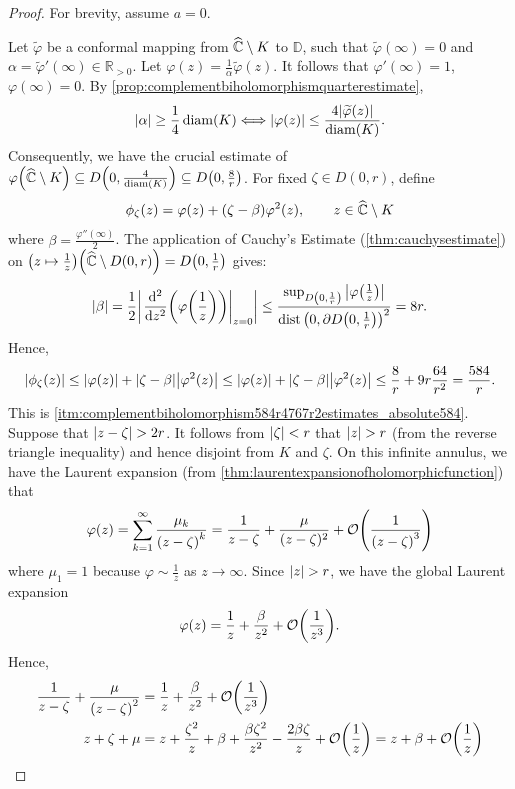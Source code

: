 \begin{proof}
    For brevity, assume \(a=0\).

    Let \(\widetilde{\varphi}\) be a conformal mapping from \(\widehat{\mathbb{C}}\setminus K\) to \(\mathbb{D}\), such that \(\widetilde{\varphi}(\infty)=0\) and \(\alpha=\widetilde{\varphi}'(\infty)\in\mathbb{R}_{>0}\). Let \(\varphi(z)=\frac{1}{\alpha}\widetilde{\varphi}(z)\). It follows that \(\varphi'(\infty)=1\), \(\varphi(\infty)=0\). By \cref{prop:complementbiholomorphismquarterestimate}, \[\abs{\alpha}\geq\frac{1}{4}\operatorname{diam}(K)\Longleftrightarrow\abs{\varphi(z)}\leq\frac{4\abs{\widetilde{\varphi}(z)}}{\operatorname{diam}(K)}.\]
    Consequently, we have the crucial estimate of \(\varphi\qty(\widehat{\mathbb{C}}\setminus K)\subseteq D\qty(0,\frac{4}{\operatorname{diam}(K)})\subseteq D\qty(0,\frac{8}{r})\). For fixed \(\zeta\in D(0,r)\), define \[\phi_\zeta(z)=\varphi(z)+(\zeta-\beta)\varphi^2(z),\qquad z\in\widehat{\mathbb{C}}\setminus K\]
    where \(\beta=\frac{\varphi''(\infty)}{2}\). The application of Cauchy's Estimate (\cref{thm:cauchysestimate}) on \(\qty(z\mapsto\frac{1}{z})\qty(\widehat{\mathbb{C}}\setminus D(0,r))=D\qty(0,\frac{1}{r})\) gives: \[\abs{\beta}=\frac{1}{2}\abs{\eval{\dv[2]{z}(\varphi\qty(\frac{1}{z}))}_{z=0}}\leq\frac{\sup_{D\qty(0,\frac1r)}\abs{\varphi\qty(\frac{1}{z})}}{\operatorname{dist}\qty(0,\partial D\qty(0,\frac{1}{r}))^2}=8r.\]
    Hence, \[\abs{\phi_\zeta(z)}\leq\abs{\varphi(z)}+\abs{\zeta-\beta}\abs{\varphi^2(z)}\leq\abs{\varphi(z)}+\abs{\zeta-\beta}\abs{\varphi^2(z)}\leq\frac{8}{r}+9r\frac{64}{r^2}=\frac{584}{r}.\] This is \cref{itm:complementbiholomorphism584r4767r2estimates_absolute584}. Suppose that \(\abs{z-\zeta}>2r\). It follows from \(\abs{\zeta}<r\) that \(\abs{z}>r\) (from the reverse triangle inequality) and hence disjoint from \(K\) and \(\zeta\). On this infinite annulus, we have the Laurent expansion (from \cref{thm:laurentexpansionofholomorphicfunction}) that \[\varphi(z)=\sum_{k=1}^\infty\frac{\mu_k}{\qty(z-\zeta)^k}=\frac{1}{z-\zeta}+\frac{\mu}{(z-\zeta)^2}+\order{\frac1{\qty(z-\zeta)^3}}\] where \(\mu_1=1\) because \(\varphi\sim\frac{1}{z}\) as \(z\to\infty\). Since \(\abs{z}>r\), we have the global Laurent expansion \[\varphi(z)=\frac1z+\frac\beta{z^2}+\order{\frac1{z^3}}.\]
    Hence,
    \begin{align*}
        \frac1{z-\zeta}+\frac\mu{\qty(z-\zeta)^2} & =\frac1z+\frac\beta{z^2}+\order{\frac1{z^3}}                                                                    \\
        z+\zeta+\mu                               & =z+\frac{\zeta^2}z+\beta+\frac{\beta\zeta^2}{z^2}-\frac{2\beta\zeta}{z}+\order{\frac1z}=z+\beta+\order{\frac1z} \\

\end{align*}
\end{proof}
